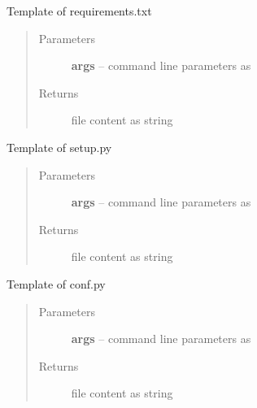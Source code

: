 \documentclass[letterpaper,10pt,english]{sphinxmanual}
\begin{document}

\begin{fulllineitems}
\label{_rst/pyscaffold:pyscaffold.templates.requirements}
Template of requirements.txt
\begin{quote}\begin{description}
\item[{Parameters}] \leavevmode
\textbf{args} -- command line parameters as \href{http://docs.python.org/2.7/library/argparse.html\#argparse.Namespace}{}

\item[{Returns}] \leavevmode
file content as string

\end{description}\end{quote}

\end{fulllineitems}


\begin{fulllineitems}
\label{_rst/pyscaffold:pyscaffold.templates.setup}
Template of setup.py
\begin{quote}\begin{description}
\item[{Parameters}] \leavevmode
\textbf{args} -- command line parameters as \href{http://docs.python.org/2.7/library/argparse.html\#argparse.Namespace}{}

\item[{Returns}] \leavevmode
file content as string

\end{description}\end{quote}

\end{fulllineitems}


\begin{fulllineitems}
\label{_rst/pyscaffold:pyscaffold.templates.sphinx_conf}
Template of conf.py
\begin{quote}\begin{description}
\item[{Parameters}] \leavevmode
\textbf{args} -- command line parameters as \href{http://docs.python.org/2.7/library/argparse.html\#argparse.Namespace}{}

\item[{Returns}] \leavevmode
file content as string

\end{description}\end{quote}

\end{fulllineitems}
\end{document}
